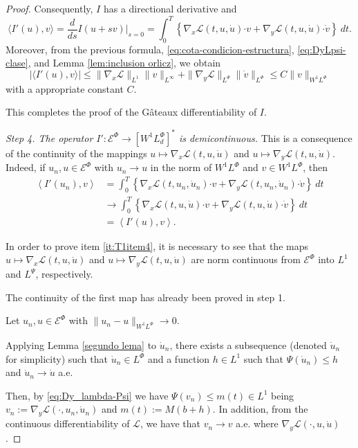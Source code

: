 \documentclass[twoside]{article}
\theoremstyle{remark}
\newcommand{\orlnor}{\|_{L^{\Phi}}}
\newcommand{\linf}{\|_{L^{\infty}}}
\newcommand{\lphi}{L^{\Phi}}
\newcommand{\lpsi}{L^{\Psi}}
\newcommand{\wphi}{W^{1}\lphi}
\newcommand{\sobnor}{\|_{W^{1}\lphi}}
\newcommand{\domi}{\mathcal{E}^{\Phi}}
\renewcommand{\b}[1]{\boldsymbol{#1}}
\newcommand{\ccdot}{\b{\cdot}}
\renewcommand{\leq}{\leqslant}
\begin{document}
\begin{proof}
Consequently, $I$ has a directional derivative and
\[
\langle I'(u),v \rangle=\frac{d}{ds}I(u+s v)\big|_{s=0}=\int_0^T  
\left\{\nabla_x\mathcal{L}(t,u,\dot{u})\ccdot v+ \nabla_y\mathcal{L}(t,u,\dot{u})\ccdot \dot{v}\right\} \ dt.
\]
Moreover, from the previous formula, \eqref{eq:cota-condicion-estructura},  \eqref{eq:DyLpsi-clase}, and
Lemma \ref{lem:inclusion orlicz}, we obtain
\[
|\langle I'(u),v \rangle| \leq \|\nabla_x\mathcal{L}\|_{L^1} \| v\linf + 
\|\nabla_y\mathcal{L}\|_{\lpsi} \|\dot{v}\orlnor \leq C \|v\sobnor
\]
with a appropriate constant $C$.

This completes the proof of the G\^ateaux differentiability of $I$. 



\emph{Step 4. The operator $I':\domi  \to \left[\wphi_d
\right]^* $ is demicontinuous.}
This is a consequence  of the continuity of the mappings $u \mapsto \nabla_x\mathcal{L}(t,u,\dot{u})$ and $u \mapsto
\nabla_y\mathcal{L}(t,u,\dot{u})$. Indeed, if $u_n,u\in \domi$ with $u_n\to u$ in the norm of $\wphi$ and $v \in
\wphi$, then
\[
\begin{split}
\left\langle  I'(u_{n}),v \right\rangle &= \int_0^T \left\{  \nabla_x\mathcal{L}\left(t,u_n,\dot{u}_n\right)\ccdot
v +
 \nabla_y\mathcal{L}\left(t,u_n,\dot{u}_n\right)\ccdot \dot{v}\right\} \ dt\\
&\rightarrow \int_0^T \left\{ \nabla_x\mathcal{L}\left(t,u,\dot{u}\right)\ccdot v+ 
\nabla_y\mathcal{L}\left(t,u,\dot{u}\right)\ccdot \dot{v}\right\} \ dt\\
&=\left\langle  I'(u),v \right\rangle.
\end{split}
\]


In order to prove item  \ref{it:T1item4}, it is necessary to see that the maps $u\mapsto \nabla_x\mathcal{L}(t,u,\dot{u})$  
and $u\mapsto \nabla_y\mathcal{L}(t,u,\dot{u})$  are norm continuous
from $\domi $ into $L^1$ and
 $\lpsi$, respectively.  

The continuity of the first map has already been proved in step 1. 


Let $u_n, u \in \domi$ with $\|u_n- u\sobnor\to 0$.  

Applying Lemma \ref{segundo lema} to $\dot{u}_n$, 
there exists a subsequence (denoted $\dot{u}_n$ for simplicity)
such that
$\dot{u}_n \in L^\Phi$ and a function  $h \in L^1$  such that  $\Psi(\dot{u}_n)\leq h$ and $\dot{u}_n \to \dot{u}$ a.e.

Then, by \eqref{eq:Dy_lambda-Psi} we have
 $ \Psi(v_n) 
	\leq m(t) \in L^1$
 being  $v_n:=\nabla_y\mathcal{L}(\cdot,u_n,\dot{u}_n)$ and $m(t):= M (b+h)$. 
In addition, from the continuous differentiability of $\mathcal{L}$, we have that
$v_n \to v$ a.e. where $\nabla_y\mathcal{L}(\cdot,u,\dot{u})$.


\end{proof}
\end{document}
